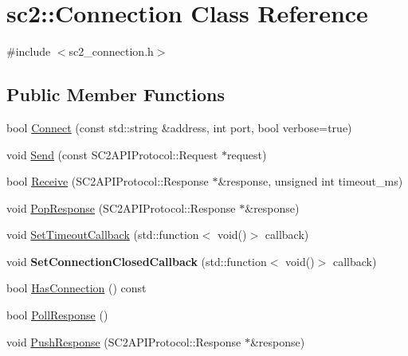 \hypertarget{classsc2_1_1_connection}{}\section{sc2\+:\+:Connection Class Reference}
\label{classsc2_1_1_connection}


{\ttfamily \#include $<$sc2\+\_\+connection.\+h$>$}

\subsection*{Public Member Functions}
\begin{DoxyCompactItemize}
\item 
bool \hyperlink{classsc2_1_1_connection_ae2b9a0a28789ac5c6304506cf0bea4b0}{Connect} (const std\+::string \&address, int port, bool verbose=true)
\item 
void \hyperlink{classsc2_1_1_connection_af6bd305434d9efd78a6868749e764749}{Send} (const S\+C2\+A\+P\+I\+Protocol\+::\+Request $\ast$request)
\item 
bool \hyperlink{classsc2_1_1_connection_a383d7968897ccc2e35c2716bb110584f}{Receive} (S\+C2\+A\+P\+I\+Protocol\+::\+Response $\ast$\&response, unsigned int timeout\+\_\+ms)
\item 
void \hyperlink{classsc2_1_1_connection_af2d5cf1aff2fef4d30ddd9ab256419ed}{Pop\+Response} (S\+C2\+A\+P\+I\+Protocol\+::\+Response $\ast$\&response)
\item 
void \hyperlink{classsc2_1_1_connection_a1a3d3c532703e0bf7a88f49ee22aa65e}{Set\+Timeout\+Callback} (std\+::function$<$ void()$>$ callback)
\item 
\mbox{\label{classsc2_1_1_connection_a1f2556582badc5f98b349efa17d823cd}} 
void {\bfseries Set\+Connection\+Closed\+Callback} (std\+::function$<$ void()$>$ callback)
\item 
bool \hyperlink{classsc2_1_1_connection_a69ca71e72ab2a0a1bad36fc729fedc02}{Has\+Connection} () const
\item 
bool \hyperlink{classsc2_1_1_connection_a7c06854ac5724952f69fb229a3defcee}{Poll\+Response} ()
\item 
void \hyperlink{classsc2_1_1_connection_aad919078849b1b85b38db8d8d11c8004}{Push\+Response} (S\+C2\+A\+P\+I\+Protocol\+::\+Response $\ast$\&response)
\end{DoxyCompactItemize}
